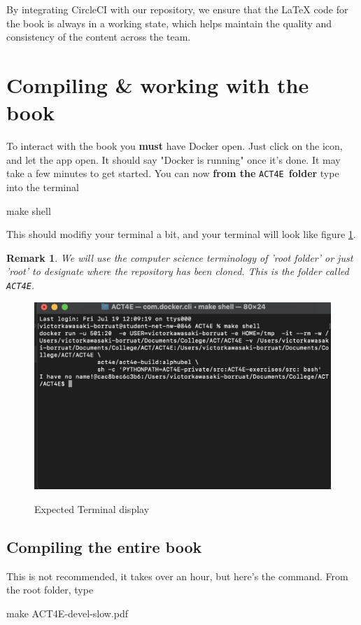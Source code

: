 \documentclass{article}
\newtheorem{remark}{Remark}
\begin{document}
By integrating CircleCI with our repository, we ensure that the LaTeX code for the book is always in a working state, which helps maintain the quality and consistency of the content across the team.


\section{Compiling \& working with the book}
To interact with the book you \textbf{must} have Docker open. Just click on the icon, and let the app open. It should say "Docker is running" once it's done. It may take a few minutes to get started. You can now \textbf{from the} \texttt{ACT4E} \textbf{folder} type into the terminal
\begin{bashcode}
    make shell
\end{bashcode}
This should modifiy your terminal a bit, and your terminal will look like figure \ref{fig:enter-label}.
\begin{remark}
    We will use the computer science terminology of 'root folder' or just 'root' to designate where the repository has been cloned. This is the folder called \texttt{ACT4E}.
\end{remark}
\begin{figure}[ht]
    \centering
    \includegraphics[width=0.5\linewidth]{make-shell.png}
    \label{fig:enter-label}
    \caption{Expected Terminal display}
\end{figure}
\subsection{Compiling the entire book}
This is not recommended, it takes over an hour, but here's the command. From the root folder, type
\begin{bashcode}
    make ACT4E-devel-slow.pdf
\end{bashcode}
\end{document}
